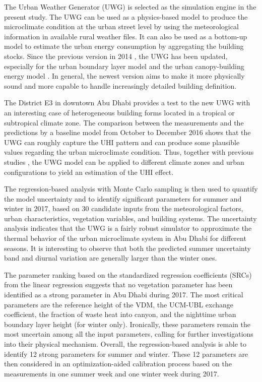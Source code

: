The Urban Weather Generator (UWG) \cite{bueno2013urban} is selected as the simulation engine in the present study. The UWG can be used as a physics-based model to produce the microclimate condition at the urban street level by using the meteorological information in available rural weather files. It can also be used as a bottom-up model to estimate the urban energy consumption by aggregating the building stocks. Since the previous version in 2014 \cite{bueno2014computationally}, the UWG has been updated, especially for the urban boundary layer model and the urban canopy-building energy model \cite{yang2016curious}. In general, the newest version aims to make it more physically sound and more capable to handle increasingly detailed building definition.

The District E3 in downtown Abu Dhabi provides a test to the new UWG with an interesting case of heterogeneous building forms located in a tropical or subtropical climate zone. The comparison between the measurements and the predictions by a baseline model from October to December 2016 shows that the UWG can roughly capture the UHI pattern and can produce some plausible values regarding the urban microclimate condition. Thus, together with previous studies \cite{bueno2013urban,bueno2014computationally,nakano2015urban,yang2016curious}, the UWG model can be applied to different climate zones and urban configurations to yield an estimation of the UHI effect.

The regression-based analysis with Monte Carlo sampling is then used to quantify the model uncertainty and to identify significant parameters for summer and winter in 2017, based on 30 candidate inputs from the meteorological factors, urban characteristics, vegetation variables, and building systems. The uncertainty analysis indicates that the UWG is a fairly robust simulator to approximate the thermal behavior of the urban microclimate system in Abu Dhabi for different seasons. It is interesting to observe that both the predicted summer uncertainty band and diurnal variation are generally larger than the winter ones.

The parameter ranking based on the standardized regression coefficients (SRCs) from the linear regression suggests that no vegetation parameter has been identified as a strong parameter in Abu Dhabi during 2017. The most critical parameters are the reference height of the VDM, the UCM-UBL exchange coefficient, the fraction of waste heat into canyon, and the nighttime urban boundary layer height (for winter only). Ironically, these parameters remain the most uncertain among all the input parameters, calling for further investigations into their physical mechanism. Overall, the regression-based analysis is able to identify 12 strong parameters for summer and winter. These 12 parameters are then considered in an optimization-aided calibration process based on the measurements in one summer week and one winter week during 2017.

